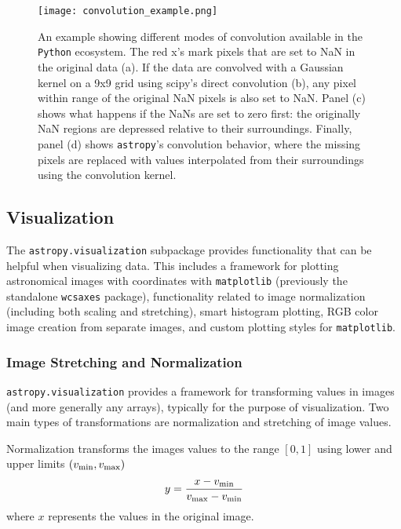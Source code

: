 \documentclass[modern]{aastex61}
\newcommand{\package}[1]{\texttt{#1}\xspace}
\newcommand{\python}{\package{Python}}
\newcommand{\astropypkg}{\package{astropy}}
\begin{document}
\begin{figure}
\texttt{[image: convolution\_example.png]}
\caption{%
    An example showing different modes of convolution available in the \python
    ecosystem.  The red x's mark pixels that are set to NaN in the original data
    (a).  If the data are convolved with a Gaussian kernel on a 9x9 grid using
    scipy's direct convolution (b), any pixel within range of the original NaN
    pixels is also set to NaN.  Panel (c) shows what happens if the NaNs are set
    to zero first: the originally NaN regions are depressed relative to their
    surroundings.  Finally, panel (d) shows \astropypkg's convolution behavior,
    where the missing pixels are replaced with values interpolated from their
    surroundings using the convolution kernel.
    \label{fig:convolution-example}
}
\end{figure}


\subsection{Visualization}

The \package{astropy.visualization} subpackage provides functionality that can be helpful when visualizing data. This includes a framework for plotting astronomical images with coordinates with \package{matplotlib} (previously the standalone \package{wcsaxes} package), functionality related to image normalization (including both scaling and stretching), smart histogram plotting, RGB color image creation from separate images, and custom plotting styles for \package{matplotlib}.

\subsubsection{Image Stretching and Normalization}

\label{sec:stretch}

\package{astropy.visualization} provides a framework for transforming values in images (and more generally any arrays), typically for the purpose of visualization. Two main types of transformations are normalization and stretching of image values.

Normalization transforms the images values to the range $[0,1]$ using lower and upper limits $(v_{\rm min}, v_{\rm max})$
\begin{equation}
y = \frac{x - v_{\rm min}}{v_{\rm max} - v_{\rm min}}
\end{equation}
where $x$ represents the values in the original image.
\end{document}
